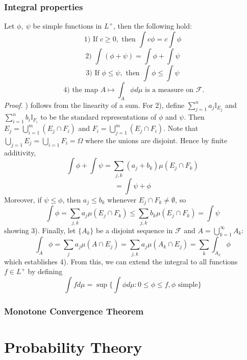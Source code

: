 \documentclass{article}
\begin{document}
\subsubsection{Integral properties}
Let $\phi, \ \psi$ be simple functions in $L^+$, then the following hold:
\[
\text{1) If } c\geq 0, \text{ then } \int c\phi = c\int \phi
\]
\[
\text{2) }\int (\phi+ \psi) = \int \phi+ \int\psi
\]
\[
\text{3) If } \phi \leq \psi, \text{ then } \int \phi \leq \int \psi
\]
\[
\text{ 4) the map } A\mapsto\int_A\phi d\mu \text{ is a measure on } \mathcal{F}.
\]
\textit{Proof.} \newline {}) follows from the linearity of a sum. For 2), define $\sum_{j=1}^na_j\mathbb{I}_{E_j}$ and $\sum_{i=1}^nb_i\mathbb{I}_{F_i}$ to be the standard representations of $\phi$ and $\psi$. 
Then $E_j = \bigcup_{i=1}^m(E_j\cap F_i)$ and $F_i = \bigcup_{j=1}^m(E_j\cap F_i)$. Note that $\bigcup_{j=1}E_j=\bigcup_{i=1}F_i=\Omega$ where the unions are disjoint. Hence by finite additivity, 
\[
\int \phi + \int \psi = \sum_{j,k}(a_j+b_k)\mu(E_j \cap F_k)
\]
\[
=\int \psi + \phi
\]
Moreover, if $\psi \leq \phi$, then $a_j\leq b_k$ whenever $E_j \cap F_k \neq \emptyset $, so 
\[
\int \phi= \sum_{j,k}a_j\mu(E_j\cap F_k) \leq \sum_{j,k}b_k\mu(E_j \cap F_k) = \int \psi
\]
showing 3). Finally, let $\{A_k\}$ be a disjoint sequence in $\mathcal{F}$ and $A= \bigcup_{k=1}^\infty A_k$:
\[
\int_A\phi= \sum_ja_j\mu(A\cap E_j)= \sum_{j,k}a_j\mu(A_k \cap E_j)= \sum_k\int_{A_k}\phi
\]
which establishes 4).\newline \newline
From this, we can extend the integral to all functions $f \in L^+$ by defining 
\[
\int f d\mu = \sup \{ \int \phi d\mu: 0 \leq \phi \leq f, \phi \text{ simple}\}
\]

\subsubsection{Monotone Convergence Theorem}


\section{Probability Theory}
\end{document}
